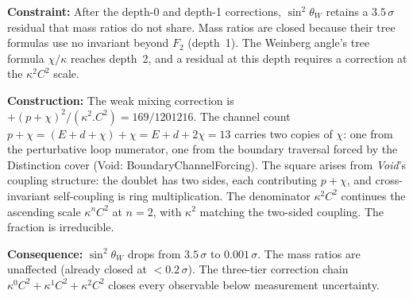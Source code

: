 \documentclass[11pt,a4paper]{book}
\def\cdot{.}%
\def\texttt#1{#1}%
\begin{document}
\medskip
\noindent
\textbf{Constraint:}
After the depth-0 and depth-1 corrections,
$\sin^2\!\theta_W$ retains a $3.5\,\sigma$ residual that mass ratios
do not share.  Mass ratios are closed because their tree formulas
use no invariant beyond $F_2$ (depth~1).  The Weinberg angle's tree
formula $\chi/\kappa$ reaches depth~2, and a residual at this depth
requires a correction at the $\kappa^2 C^2$ scale.

\medskip
\noindent
\textbf{Construction:}
The weak mixing correction is
$+(p + \chi)^2/(\kappa^2 \cdot C^2) = 169/1201216$.
The channel count $p + \chi = (E + d + \chi) + \chi = E + d + 2\chi = 13$
carries two copies of $\chi$: one from the perturbative loop numerator,
one from the boundary traversal forced by the Distinction cover
(Void: \texttt{BoundaryChannelForcing}).
The square arises from \textit{Void}'s coupling structure:
the doublet has two sides, each contributing $p + \chi$, and
cross-invariant self-coupling is ring multiplication.
The denominator $\kappa^2 C^2$ continues the ascending scale $\kappa^n C^2$
at $n = 2$, with $\kappa^2$ matching the two-sided coupling.
The fraction is irreducible.

\medskip
\noindent
\textbf{Consequence:}
$\sin^2\!\theta_W$ drops from $3.5\,\sigma$ to $0.001\,\sigma$.
The mass ratios are unaffected (already closed at $< 0.2\,\sigma$).
The three-tier correction chain $\kappa^0 C^2 + \kappa^1 C^2 +
\kappa^2 C^2$ closes every observable below measurement
uncertainty.
\end{document}
